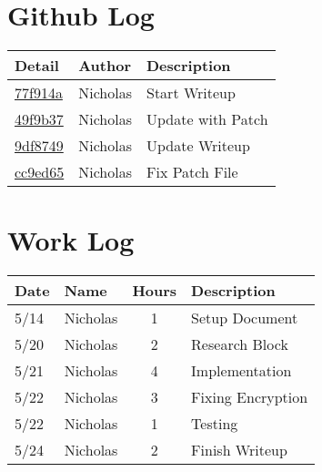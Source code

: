 \documentclass[letterpaper,10pt,fleqn,draftclsnofoot,onecolumn]{IEEEtran}
\begin{document}
	\section*{ Github Log }
	\begin{tabular}{l l p{1.5in}}\textbf{Detail} & \textbf{Author} & \textbf{Description}\\\hline
		\href{https://github.com/Skinnern/CS444/commit/77f914a6fe466b8115d31d7a97e08b2e86b00b7a}{77f914a} & Nicholas & Start Writeup\\\hline
		\href{https://github.com/Skinnern/CS444/commit/49f9b37d655d697e8b1920ff55d81f436ba8712a}{49f9b37} & Nicholas & Update with Patch\\\hline
		\href{https://github.com/Skinnern/CS444/commit/9df8749ef6f1f50dbcf79f0da37e65cf45f5421c}{9df8749} & Nicholas & Update Writeup\\\hline
		\href{https://github.com/Skinnern/CS444/commit/cc9ed65f3d4bf9db8bc0b8af124e418ba2d62287}{cc9ed65} & Nicholas & Fix Patch File\\\hline
	\end{tabular}
	
	
	\section*{Work Log}
	\begin{tabular}{l l c p{1.1in}}\textbf{Date} & \textbf{Name} & \textbf{Hours} & \textbf{Description}\\\hline
		5/14 & Nicholas & 1 & Setup Document\\\hline
		5/20 & Nicholas & 2 & Research Block\\\hline
		5/21 & Nicholas & 4 & Implementation\\\hline
		5/22 & Nicholas & 3 & Fixing Encryption\\\hline
		5/22 & Nicholas & 1 & Testing\\\hline
		5/24 & Nicholas & 2 & Finish Writeup\\\hline
	\end{tabular}
		\nocite{*}
		
		
	
\end{document}
